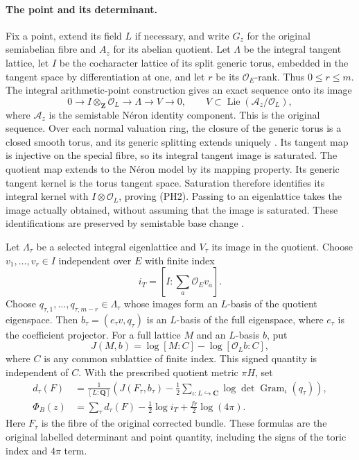 \paragraph{The point and its determinant.}
Fix a point, extend its field $L$ if necessary, and write $G_z$ for
the original semiabelian fibre and $A_z$ for its abelian quotient.
Let $\Lambda$ be the integral tangent lattice, let $I$ be the
cocharacter lattice of its split generic torus, embedded in the
tangent space by differentiation at one, and let $r$ be its
$\mathcal O_E$-rank. Thus $0\le r\le m$. The integral
arithmetic-point construction gives an exact sequence onto its image
\[
 0\longrightarrow I\otimes_{\mathbf Z}\mathcal O_L
   \longrightarrow\Lambda\longrightarrow V\longrightarrow0,
 \qquad V\subset\operatorname{Lie}(\mathcal A_z/\mathcal O_L),
 \tag{PH2}
\]
where $\mathcal A_z$ is the semistable N\'eron identity component.
This is the original sequence. Over each normal valuation ring,
the closure of the generic torus is a closed smooth torus, and its
generic splitting extends uniquely \cite[Propositions 3.3.1.5
and 3.3.1.7]{point-height-lan}. Its tangent map is injective on
the special fibre, so its integral tangent image is saturated.
The quotient map extends to the N\'eron model by its mapping
property. Its generic tangent kernel is the torus tangent space.
Saturation therefore identifies its integral kernel with
$I\otimes\mathcal O_L$, proving \textup{(PH2)}. Passing to an
eigenlattice takes the image actually obtained, without assuming
that the image is saturated. These identifications are preserved
by semistable base change \cite{conrad-semistable,actual-point-height-source}.

Let $\Lambda_\tau$ be a selected integral eigenlattice and
$V_\tau$ its image in the quotient. Choose $v_1,\ldots,v_r\in I$
independent over $E$ with finite index
\[
                  i_T=[I:\textstyle\sum_a\mathcal O_Ev_a].
\]
Choose $q_{\tau,1},\ldots,q_{\tau,m-r}\in\Lambda_\tau$
whose images form an $L$-basis of the quotient eigenspace. Then
$b_\tau=(e_\tau v,q_\tau)$ is an $L$-basis of the full
eigenspace, where $e_\tau$ is the coefficient projector.
For a full lattice $M$ and an $L$-basis $b$, put
\[
 J(M,b)=\log[M:C]-\log[\mathcal O_L b:C],
 \tag{PH3}
\]
where $C$ is any common sublattice of finite index. This signed
quantity is independent of $C$. With the prescribed quotient
metric $\pi H$, set
\[
 \begin{split}
 d_\tau(F)&=\frac{1}{[L:\mathbf Q]}
   \left(J(F_\tau,b_\tau)
     -\frac12\sum_{\iota:L\hookrightarrow\mathbf C}
                     \log\det\operatorname{Gram}_\iota(q_\tau)\right),\\
 \Phi_B(z)&=\sum_\tau d_\tau(F)-\frac12\log i_T
                                  +\frac{fr}{2}\log(4\pi).
 \end{split}
 \tag{PH4}
\]
Here $F_\tau$ is the fibre of the original corrected bundle.
These formulas are the original labelled determinant and point
quantity, including the signs of the toric index and $4\pi$ term.

